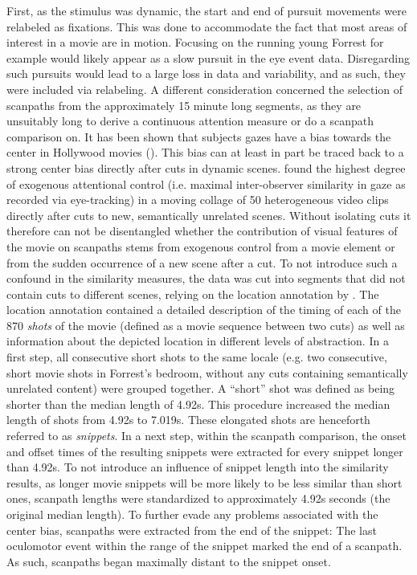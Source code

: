 \documentclass[a4paper, 12pt]{scrreprt}
\begin{document}
First, as the stimulus was dynamic, the start and end of pursuit movements were relabeled as fixations. This was done to accommodate the fact that most areas of interest in a movie are in motion. Focusing on the running young Forrest for example would likely appear as a slow pursuit in the eye event data. Disregarding such pursuits would lead to a large loss in data and variability, and as such, they were included via relabeling. \newline A different consideration concerned the selection of scanpaths from the approximately 15 minute long segments, as they are unsuitably long to derive a continuous attention measure or do a scanpath comparison on. It has been shown that subjects gazes have a bias towards the center in Hollywood movies (\cite{tseng2009quantifying}). This bias can at least in part be traced back to a strong center bias directly after cuts in dynamic scenes. \textcite{carmi2006visual} found the highest degree of exogenous attentional control (i.e. maximal inter-observer similarity in gaze as recorded via eye-tracking) in a moving collage of 50 heterogeneous video clips directly after cuts to new, semantically unrelated scenes. Without isolating cuts it therefore can not be disentangled whether the contribution of visual features of the movie on scanpaths stems from exogenous control from a movie element or from the sudden occurrence of a new scene after a cut. To not introduce such a confound in the similarity measures, the data was cut into segments that did not contain cuts to different scenes, relying on the location annotation by \textcite{hausler2016annotation}. The location annotation contained a detailed description of the timing of each of the 870 \textit{shots }of the movie (defined as a movie sequence between two cuts) as well as information about the depicted location in different levels of abstraction. In a first step, all consecutive short shots to the same locale (e.g. two consecutive, short movie shots in Forrest's bedroom, without any cuts containing semantically unrelated content) were grouped together. A “short” shot was defined as being shorter than the median length of 4.92s. This procedure increased the median length of shots from 4.92s to 7.019s. These elongated shots are henceforth referred to as \textit{snippets}. In a next step, within the scanpath comparison, the onset and offset times of the resulting snippets were extracted for every snippet longer than 4.92s. To not introduce an influence of snippet length into the similarity results, as longer movie snippets will be more likely to be less similar than short ones, scanpath lengths were standardized to approximately 4.92s seconds (the original median length). To further evade any problems associated with the center bias, scanpaths were extracted from the end of the snippet: The last oculomotor event within the range of the snippet marked the end of a scanpath. As such, scanpaths began maximally distant to the snippet onset.
\end{document}

